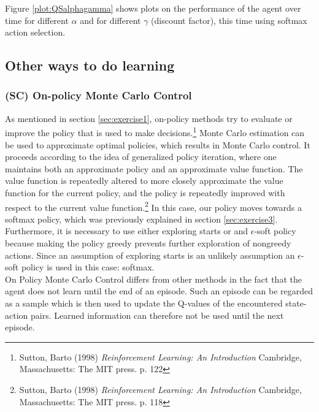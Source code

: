 \documentclass{article}
\begin{document}
Figure \ref{plot:QSalphagamma} shows plots on the performance of the agent over time for different $\alpha$ and for different $\gamma$ (discount factor), this time using softmax action selection.

 \label{plot:QSalphagamma}


\subsection{Other ways to do learning}

\subsubsection{(SC) On-policy Monte Carlo Control}\label{sec:exercise4.1}
As mentioned in section \ref{sec:exercise1}, on-policy methods try to evaluate or improve the policy that is used to make decisions.\footnote{Sutton, Barto (1998) \textit{Reinforcement Learning: An Introduction} Cambridge, Massachusetts: The MIT press. p. 122} Monte Carlo estimation can be used to approximate optimal policies, which results in Monte Carlo control. It proceeds according to the idea of generalized policy iteration, where one maintains both an approximate policy and an approximate value function. The value function is repeatedly altered to more closely approximate the value function for the current policy, and the policy is repeatedly improved with respect to the current value function.\footnote{Sutton, Barto (1998) \textit{Reinforcement Learning: An Introduction} Cambridge, Massachusetts: The MIT press. p. 118} In this case, our policy moves towards a softmax policy, which was previously explained in section \ref{sec:exercise3}. Furthermore, it is necessary to use either exploring starts or and $\epsilon$-soft policy because making the policy greedy prevents further exploration of nongreedy actions. Since an assumption of exploring starts is an unlikely assumption an $\epsilon$-soft policy is used in this case: softmax.\\ 

On Policy Monte Carlo Control differs from other methods in the fact that the agent does not learn until the end of an episode. Such an episode can be regarded as a sample which is then used to update the Q-values of the encountered state-action pairs. Learned information can therefore not be used until the next episode.\\ 
\end{document}
